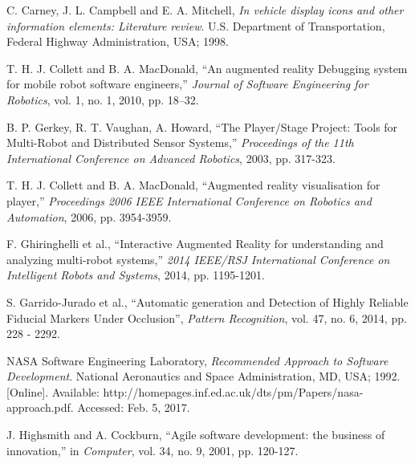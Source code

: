 \documentclass[hidelinks,10pt]{article}
\begin{document}
\begin{thebibliography}{1}
 C. Carney, J. L. Campbell and E. A. Mitchell, \textit{In vehicle display icons and other information elements: Literature review}. U.S. Department of Transportation, Federal Highway Administration, USA; 1998.

 T. H. J. Collett and B. A. MacDonald, ``An augmented reality Debugging system for mobile robot software engineers,'' \textit{Journal of Software Engineering for Robotics}, vol. 1, no. 1, 2010, pp. 18–32.

 B. P. Gerkey, R. T. Vaughan, A. Howard, ``The Player/Stage Project: Tools for Multi-Robot and Distributed Sensor Systems,'' \textit{Proceedings of the 11th International Conference on Advanced Robotics}, 2003, pp. 317-323.

 T. H. J. Collett and B. A. MacDonald, ``Augmented reality visualisation for player,'' \textit{Proceedings 2006 IEEE International Conference on Robotics and Automation}, 2006, pp. 3954-3959.

 F. Ghiringhelli et al., ``Interactive Augmented Reality for understanding and analyzing multi-robot systems,'' \textit{2014 IEEE/RSJ International Conference on Intelligent Robots and Systems}, 2014, pp. 1195-1201.

 S. Garrido-Jurado et al., ``Automatic generation and Detection of Highly Reliable Fiducial Markers Under Occlusion'', \textit{Pattern Recognition}, vol. 47, no. 6, 2014, pp. 228 - 2292.

 NASA Software Engineering Laboratory, \textit{Recommended Approach to Software Development}. National Aeronautics and Space Administration, MD, USA; 1992. [Online]. Available: http://homepages.inf.ed.ac.uk/dts/pm/Papers/nasa-approach.pdf. Accessed: Feb. 5, 2017.

 J. Highsmith and A. Cockburn, ``Agile software development: the business of innovation,'' in \textit{Computer}, vol. 34, no. 9, 2001, pp. 120-127.

\end{thebibliography}
\end{document}
